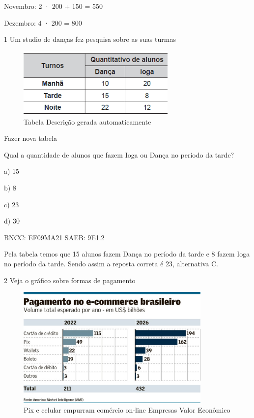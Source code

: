 \begin{escolha}
{{{\begin{escolha}
{{{{{\begin{escolha}
\begin{escolha}
{\begin{q°}
Novembro: 2 · 200 + 150 = 550

Dezembro: 4 · 200 = 800


\num{1}
  Um studio de danças fez pesquisa sobre as suas turmas

\begin{figure}
\centering
\includegraphics[width=3.04861in,height=1.34722in]{./_SAEB_9_MAT/media/image224.png}
\caption{Tabela Descrição gerada automaticamente}
\end{figure}

Fazer nova tabela

Qual a quantidade de alunos que fazem Ioga ou Dança no período da tarde?

a) 15

b) 8

c) 23

d) 30

BNCC: EF09MA21 SAEB: 9E1.2

Pela tabela temos que 15 alunos fazem Dança no período da tarde e 8
fazem Ioga no período da tarde. Sendo assim a reposta correta é 23,
alternativa C.

\num{2} Veja o gráfico sobre formas de pagamento

\begin{figure}
\centering
\includegraphics[width=3.75in,height=2.34772in]{./_SAEB_9_MAT/media/image225.jpeg}
\caption{Pix e celular empurram comércio on-line \textbar{} Empresas
\textbar{} Valor Econômico}
\end{figure}


\end{q°}}
\end{escolha}
\end{escolha}}}}}}
\end{escolha}}}}
\end{escolha}
